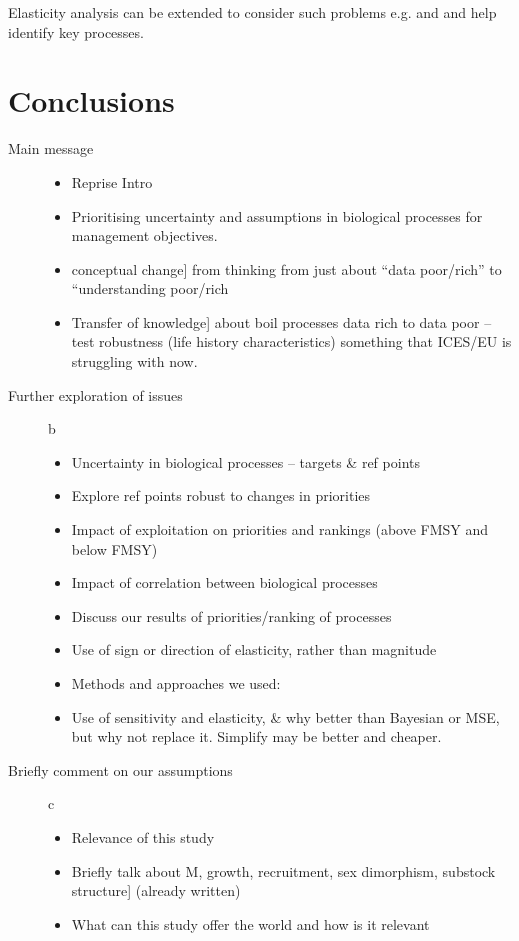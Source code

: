 \documentclass[10pt]{article}
\begin{document}
Elasticity analysis can be extended to consider such problems e.g. \cite{root1998evaluating} and \cite{henle2004role} and help identify key processes.


\section{Conclusions}\label{Conclusions}


\begin{description}
 \item [Main message]
\begin{itemize}
 \item Reprise Intro
 \item Prioritising uncertainty and assumptions in biological processes for management objectives.
 \item conceptual change] from thinking from just about “data poor/rich” to “understanding poor/rich
 \item Transfer of knowledge] about boil processes data rich to data poor –test robustness (life history characteristics) something that ICES/EU is struggling with now.
\end{itemize}
 \item [Further exploration of issues]  b
\begin{itemize}
 \item Uncertainty in biological processes – targets \& ref points
 \item Explore ref points robust to changes in priorities
 \item Impact of exploitation on priorities and rankings (above FMSY and below FMSY)
 \item Impact of correlation between biological processes
 \item Discuss our results of priorities/ranking of processes
 \item Use of sign or direction of elasticity, rather than magnitude
 \item Methods and approaches we used:
 \item Use of sensitivity and elasticity, \& why better than Bayesian or MSE, but why not replace it. Simplify may be better and cheaper.
\end{itemize}

 \item [Briefly comment on our assumptions]  c
\begin{itemize}
 \item Relevance of this study
 \item Briefly talk about M, growth, recruitment, sex dimorphism, substock structure] (already written)
 \item What can this study offer the world and how is it relevant
\end{itemize}
\end{description}
\end{document}
